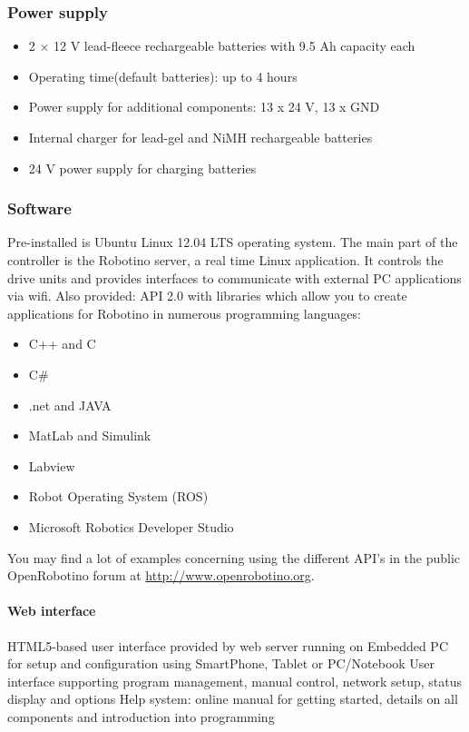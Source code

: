 \documentclass[12pt,twoside]{article}
\begin{document}
\begin{appendix}
\subsubsection{Power supply}
\begin{itemize}
\item 2 $\times$ 12 V lead-fleece rechargeable batteries with 9.5 Ah
  capacity each
\item Operating time(default batteries): up to 4 hours
\item Power supply for additional components: 13 x 24 V, 13 x GND
\item Internal charger for lead-gel and NiMH rechargeable batteries
\item 24 V power supply for charging batteries
\end{itemize}

\subsubsection{Software}
Pre-installed is Ubuntu Linux 12.04 LTS operating system. The main
part of the controller is the Robotino server, a real time Linux
application. It controls the drive units and provides interfaces to
communicate with external PC applications via wifi. Also provided: API
2.0 with libraries which allow you to create applications for Robotino
in numerous programming languages:

\begin{itemize}
\item C++ and C 
\item C\# 
\item .net and JAVA 
\item MatLab and Simulink
\item Labview
\item Robot Operating System (ROS)
\item Microsoft Robotics Developer Studio
\end{itemize}

You may find a lot of examples concerning using the different API's in
the public OpenRobotino forum at \url{http://www.openrobotino.org}.

\paragraph{Web interface}
HTML5-based user interface provided by web server running on Embedded
PC for setup and configuration using SmartPhone, Tablet or PC/Notebook
User interface supporting program management, manual control, network
setup, status display and options Help system: online manual for
getting started, details on all components and introduction into
programming


\end{appendix}
\end{document}
